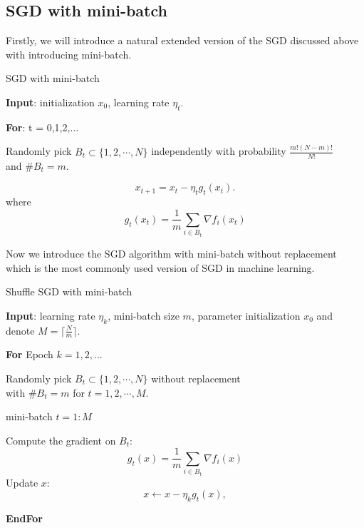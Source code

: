 \subsection{SGD with mini-batch}
Firstly, we will introduce a natural extended version of the SGD discussed above with introducing mini-batch. 

\begin{algorithm}[H]\caption{SGD with mini-batch}
	\label{alg:SGD}
	{\bf Input}: initialization $x_0$, learning rate $\eta_t$.
	
	{\bf For}: t = 0,1,2,$\dots$ 
	
	\begin{center}
	Randomly pick $B_t \subset \{1, 2, \cdots, N\}$ independently 
	with probability $\frac{m!(N-m)!}{N!}$ \\
	and $\# B_t = m$.%
	\end{center}
	\begin{equation}\label{equ:sgd-iteration}
	x_{t+1} = x_{t} - \eta_t g_t(x_t).
	\end{equation}
	\quad where 
	$$
	g_{t}(x_t) = \frac{1}{m} \sum_{i \in B_{t}}  \nabla f_i(x_t)
	$$
\end{algorithm}

Now we introduce the SGD algorithm with mini-batch without replacement which is the most commonly used version of SGD in machine learning.
\begin{algorithm}[H]
	\caption{Shuffle SGD with mini-batch}
	\label{alg:mini-batch}
	{\bf Input}: learning rate $\eta_k$, mini-batch size $m$, parameter initialization $ x_{0}$ and denote $M = \lceil \frac{N}{m} \rceil$. 
	
	{\bf For} Epoch $k = 1,2,\dots$
	
	\begin{center}
	Randomly pick $B_t \subset \{1, 2, \cdots, N \}$ without replacement \\
	with $\# B_t = m$ for $t = 1,2,\cdots,M$.
	\end{center}
	
	 mini-batch $t = 1:M$
	
	\quad Compute the gradient on $B_{t}$:
	$$
	g_{t}(x) = \frac{1}{m} \sum_{i \in B_{t}}  \nabla f_i(x)
	$$
	\quad Update $x$:
	\begin{equation*}
	x  \leftarrow  x - \eta_k g_t(x),
	\end{equation*} 


	{\bf EndFor}
\end{algorithm}

